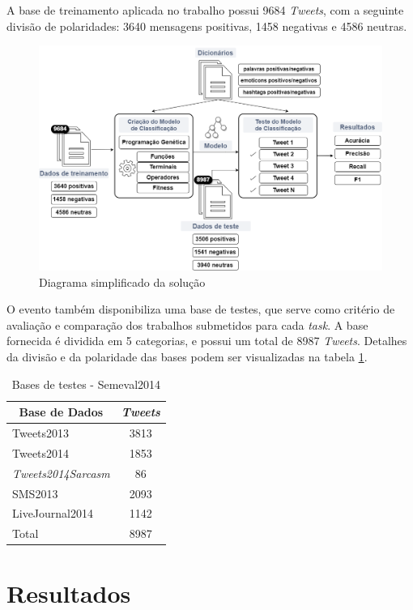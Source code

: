 \documentclass[12pt]{article}
\begin{document}
A base de treinamento aplicada no trabalho possui 9684 \emph{Tweets}, com a seguinte divisão de polaridades: 3640 mensagens positivas, 1458 negativas e 4586 neutras.

\begin{figure}[H]
	\centering
	\includegraphics[width=1\textwidth]{diagrama3}
	\caption{Diagrama simplificado da solução}
	\label{diagrama}
\end{figure}

O evento também disponibiliza uma base de testes, que serve como critério de avaliação e comparação dos trabalhos submetidos para cada \emph{task}. A base fornecida é dividida em 5 categorias, e possui um total de 8987 \emph{Tweets}. Detalhes da divisão e da polaridade das bases podem ser visualizadas na tabela \ref{datasets}.

\begin{table}[H]
\centering
	\begin{tabular}{lc}
	\multicolumn{1}{c}{\textbf{Base de Dados}} & \textit{\textbf{Tweets}} \\ \hline
	Tweets2013 & 3813 \\ \hline
	Tweets2014 & 1853 \\ \hline
	\textit{Tweets2014Sarcasm} & 86 \\ \hline
	SMS2013 & 2093 \\ \hline
	LiveJournal2014 & 1142 \\ \hline
	Total & 8987 \\ \hline
	\end{tabular}
\caption{Bases de testes - Semeval2014}
\label{datasets}
\end{table}

\section{Resultados}
\end{document}
